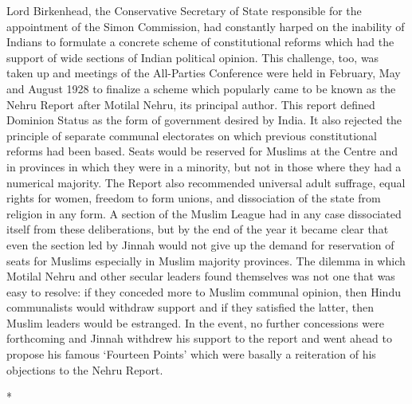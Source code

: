 Lord Birkenhead, the Conservative Secretary of State responsible for the appointment of the Simon Commission, had constantly harped on the inability of Indians to formulate a concrete scheme of constitutional reforms which had the support of wide sections of Indian political opinion. This challenge, too, was taken up and meetings of the All-Parties Conference were held in February, May and August 1928 to finalize a scheme which popularly came to be known as the Nehru Report after Motilal Nehru, its principal author. This report defined Dominion Status as the form of government desired by India. It also rejected the principle of separate communal electorates on which previous constitutional reforms had been based. Seats would be reserved for Muslims at the Centre and in provinces in which they were in a minority, but not in those where they had a numerical majority. The Report also recommended universal adult suffrage, equal rights for women, freedom to form unions, and dissociation of the state from religion in any form. A section of the Muslim League had in any case dissociated itself from these deliberations, but by the end of the year it became clear that even the section led by Jinnah would not give up the demand for reservation of seats for Muslims especially in Muslim majority provinces. The dilemma in which Motilal Nehru and other secular leaders found themselves was not one that was easy to resolve: if they conceded more to Muslim communal opinion, then Hindu communalists would withdraw support and if they satisfied the latter, then Muslim leaders would be estranged. In the event, no further concessions were forthcoming and Jinnah withdrew his support to the report and went ahead to propose his famous `Fourteen Points' which were basally a reiteration of his objections to the Nehru Report.

\begin{center}*\end{center}

\paragraph*{}

